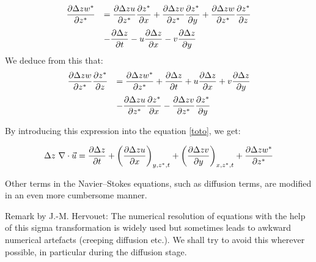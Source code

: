 \begin{equation}
\begin{array}{ll}
\dfrac{\partial \Delta zw^{\ast}}{\partial z^{\ast}}&=
\dfrac{\partial \Delta zu}{\partial z^{\ast}}
\dfrac{\partial z^{\ast}}{\partial x}+\dfrac{\partial\Delta
zv}{\partial z^{\ast}}\dfrac{\partial z^{\ast}}{\partial
y}+\dfrac{\partial \Delta zw}{\partial z^{\ast}}
\dfrac{\partial z^{\ast}}{\partial z}\medskip \\
&-\dfrac{\partial \Delta z}{\partial t}-u\dfrac{\partial \Delta z}{\partial
x}-v\dfrac{\partial \Delta z}{\partial y}%
\end{array}
\end{equation}
We deduce from this that:
\begin{equation}
\begin{array}{ll}
\dfrac{\partial \Delta zw}{\partial z^{\ast}}
\dfrac{\partial z^{\ast}}{\partial z}&=\dfrac{\partial \Delta zw^{\ast}%
}{\partial z^{\ast}}+\dfrac{\partial \Delta z}{\partial
t}+u\dfrac{\partial \Delta z}{\partial x}+v\dfrac{\partial \Delta z}{\partial y}\medskip \\
&-\dfrac{\partial \Delta zu}{\partial z^{\ast}}
\dfrac{\partial z^{\ast}}{\partial x}-\dfrac{\partial \Delta zv}{\partial
z^{\ast}}\dfrac{\partial z^{\ast}}{\partial y}%
\end{array}
\end{equation}


By introducing this expression into the equation \eqref{toto}, we get:

\begin{equation}
\Delta z~\nabla \cdot\vec{u}=\dfrac{\partial \Delta z}{\partial t}+\left(
\dfrac{\partial \Delta zu}{\partial x}\right)  _{y,z^{\ast},t}+\left(
\dfrac{\partial \Delta zv}{\partial y}\right)  _{x,z^{\ast},t}+
\dfrac{\partial \Delta zw^{\ast}}{\partial z^{\ast}}
\label{divutransf}
\end{equation}

Other terms in the Navier--Stokes equations, such as diffusion terms, are
modified in an even more cumbersome manner.

\begin{CommentBlock}{Remark by J.-M. Hervouet:}
The numerical resolution of equations with the help of this sigma transformation is widely used but sometimes
leads to awkward numerical artefacts (creeping diffusion etc.). We shall try
to avoid this wherever possible, in particular during the diffusion stage.
\end{CommentBlock}


